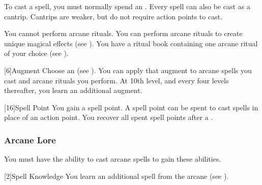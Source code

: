            To cast a spell, you must normally spend an .
            Every spell can also be cast as a cantrip.
            Cantrips are weaker, but do not require action points to cast.

             You cannot perform arcane rituals.
             You can perform arcane rituals to create unique magical effects (see ).
            You have a ritual book containing one arcane ritual of your choice (see ).

            [6]{Augment}
            Choose an  (see ).
            You can apply that augment to arcane spells you cast and arcane rituals you perform.
            At 10th level, and every four levels thereafter, you learn an additional augment.

            [16]{Spell Point}
            You gain a spell point.
            A spell point can be spent to cast spells in place of an action point.
            You recover all spent spell points after a .

        \subsubsection{Arcane Lore}
            You must have the ability to cast arcane spells to gain these abilities.

            [2]{Spell Knowledge} 
            You learn an additional spell from the arcane  (see ).

